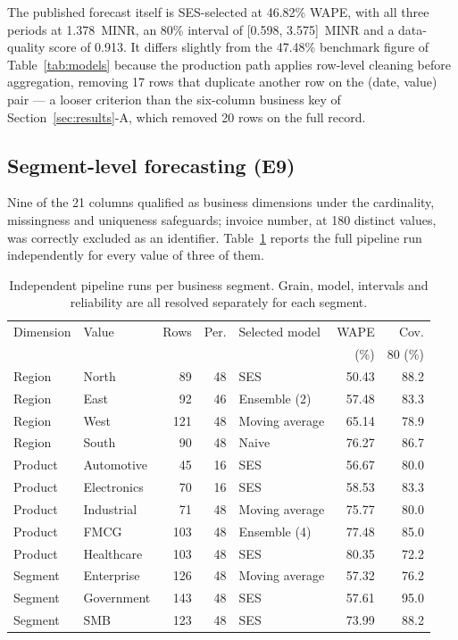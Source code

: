 \documentclass[conference]{IEEEtran}
\begin{document}
The published forecast itself is SES-selected at 46.82\% WAPE, with all three
periods at 1.378~MINR, an 80\% interval of [0.598, 3.575]~MINR and a
data-quality score of 0.913. It differs slightly from the 47.48\% benchmark
figure of Table~\ref{tab:models} because the production path applies row-level
cleaning before aggregation, removing 17 rows that duplicate another row on
the (date, value) pair --- a looser criterion than the six-column business key
of Section~\ref{sec:results}-A, which removed 20 rows on the full record.

\subsection{Segment-level forecasting (E9)}

Nine of the 21 columns qualified as business dimensions under the cardinality,
missingness and uniqueness safeguards; invoice number, at 180 distinct values,
was correctly excluded as an identifier. Table~\ref{tab:segments} reports the
full pipeline run independently for every value of three of them.

\begin{table}[!t]
\caption{Independent pipeline runs per business segment. Grain, model,
intervals and reliability are all resolved separately for each segment.}
\label{tab:segments}
\centering
\footnotesize
\setlength{\tabcolsep}{3pt}
\begin{tabular}{@{}llrrlrr@{}}
\toprule
Dimension & Value & Rows & Per. & Selected model & WAPE & Cov.\\
          &       &      &      &                & (\%) & 80 (\%)\\
\midrule
Region & North       & 89  & 48 & SES              & 50.43 & 88.2 \\
Region & East        & 92  & 46 & Ensemble (2)     & 57.48 & 83.3 \\
Region & West        & 121 & 48 & Moving average   & 65.14 & 78.9 \\
Region & South       & 90  & 48 & Naive            & 76.27 & 86.7 \\
Product & Automotive & 45  & 16 & SES              & 56.67 & 80.0 \\
Product & Electronics& 70  & 16 & SES              & 58.53 & 83.3 \\
Product & Industrial & 71  & 48 & Moving average   & 75.77 & 80.0 \\
Product & FMCG       & 103 & 48 & Ensemble (4)     & 77.48 & 85.0 \\
Product & Healthcare & 103 & 48 & SES              & 80.35 & 72.2 \\
Segment & Enterprise & 126 & 48 & Moving average   & 57.32 & 76.2 \\
Segment & Government & 143 & 48 & SES              & 57.61 & 95.0 \\
Segment & SMB        & 123 & 48 & SES              & 73.99 & 88.2 \\
\bottomrule
\end{tabular}
\end{table}
\end{document}
